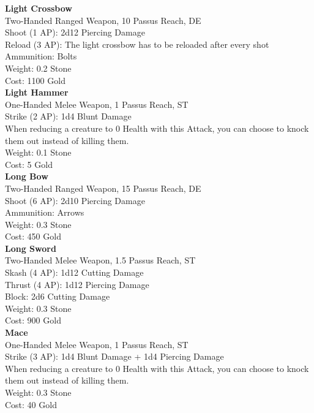 \textbf{Light Crossbow}\\
Two-Handed Ranged Weapon, 10 Passus Reach, DE\\
Shoot (1 AP): 2d12 Piercing Damage\\
Reload (3 AP): The light crossbow has to be reloaded after every shot\\
Ammunition: Bolts\\
Weight: 0.2 Stone\\
Cost: 1100 Gold\\


\textbf{Light Hammer}\\
One-Handed Melee Weapon, 1 Passus Reach, ST\\
Strike (2 AP): 1d4 Blunt Damage\\
When reducing a creature to 0 Health with this Attack, you can choose to knock them out instead of killing them.\\
Weight: 0.1 Stone\\
Cost: 5 Gold\\


\textbf{Long Bow}\\
Two-Handed Ranged Weapon, 15 Passus Reach, DE\\
Shoot (6 AP): 2d10 Piercing Damage\\
Ammunition: Arrows\\
Weight: 0.3 Stone\\
Cost: 450 Gold\\


\textbf{Long Sword}\\
Two-Handed Melee Weapon, 1.5 Passus Reach, ST\\
Skash (4 AP): 1d12 Cutting Damage\\
Thrust (4 AP): 1d12 Piercing Damage\\
Block: 2d6 Cutting Damage\\
Weight: 0.3 Stone\\
Cost: 900 Gold\\


\textbf{Mace}\\
One-Handed Melee Weapon, 1 Passus Reach, ST\\
Strike (3 AP): 1d4 Blunt Damage + 1d4 Piercing Damage\\
When reducing a creature to 0 Health with this Attack, you can choose to knock them out instead of killing them.\\
Weight: 0.3 Stone\\
Cost: 40 Gold\\


